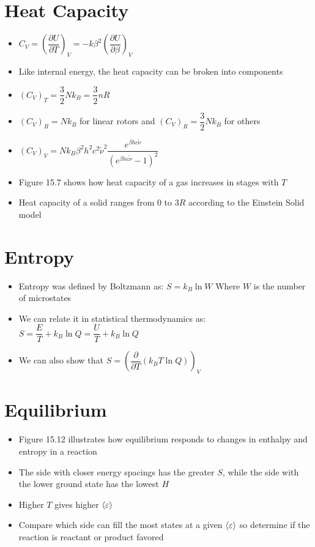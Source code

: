 \documentclass[12pt, openany, letterpaper]{memoir}
\begin{document}
\section*{Heat Capacity}
\begin{itemize}
	\item $C_V = \left(\dfrac{\partial U}{\partial T}\right)_V = -k\beta^2\left(\dfrac{\partial U}{\partial \beta}\right)_V$
	\item Like internal energy, the heat capacity can be broken into components
	\item $\left(C_V\right)_T = \dfrac{3}{2}Nk_B = \dfrac{3}{2}nR$
	\item $\left(C_V\right)_R = Nk_B$ for linear rotors and $\left(C_V\right)_R = \dfrac{3}{2}Nk_B$ for others
	\item $\left(C_V\right)_V = Nk_B\beta^2h^2c^2\tilde{\nu}^2\dfrac{e^{\beta hc\tilde{\nu}}}{\left(e^{\beta hc\tilde{\nu}}-1\right)^2}$
	\item Figure 15.7 shows how heat capacity of a gas increases in stages with $T$
	\item Heat capacity of a solid ranges from $0$ to $3R$ according to the Einstein Solid model
\end{itemize}
\section*{Entropy}
\begin{itemize}
	\item Entropy was defined by Boltzmann as: $S=k_B\ln W$ Where $W$ is the number of microstates
	\item We can relate it in statistical thermodynamics as: $S=\dfrac{E}{T} + k_B\ln Q = \dfrac{U}{T}+k_B\ln Q$
	\item We can also show that $S = \left(\dfrac{\partial}{\partial T}(k_BT\ln Q)\right)_V$
\end{itemize}
\section*{Equilibrium}
\begin{itemize}
	\item Figure 15.12 illustrates how equilibrium responds to changes in enthalpy and entropy in a reaction
	\item The side with closer energy spacings has the greater $S$, while the side with the lower ground state has the lowest $H$
	\item Higher $T$ gives higher $\left< \varepsilon \right>$
	\item Compare which side can fill the most states at a given $\left< \varepsilon \right>$ so determine if the reaction is reactant or product favored
\end{itemize}
\end{document}
